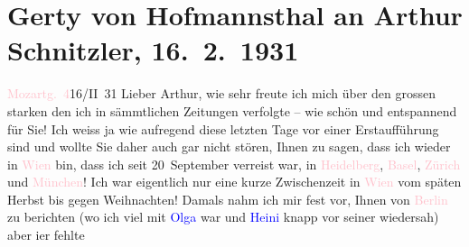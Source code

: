 

               \section[Gerty von Hofmannsthal an Arthur Schnitzler, 16. 2. 1931]{ Gerty von Hofmannsthal an Arthur Schnitzler, 16. 2. 1931}\nopagebreak{}\rehead{ }\normalsize\beginnumbering{} \toendnotes[C]{\smallbreak\pagebreak[2]} 
\toendnotes[C]{\smallbreak}\pstart
           \raggedleft{}{\pb}\textcolor{pink}{Mozartg. 4}{}\ledrightnote{\textcolor{pink}{Mozartgasse}}{ }16/II 31\pend
           \pstart
           Lieber Arthur, wie sehr freute ich mich über den grossen starken
                  \label{K_L02542_1v}\label{K_L02542_1h} den ich in sämmtlichen Zeitungen verfolgte –
               wie schön und entspannend für Sie! Ich weiss ja wie aufregend diese letzten Tage vor
               einer Erstaufführung sind und wollte Sie daher auch gar nicht stören, Ihnen zu sagen,
               dass ich wieder in \textcolor{pink}{Wien}{}\ledrightnote{\textcolor{pink}{Wien}} bin, dass ich seit
                  20 September verreist war, in \textcolor{pink}{Heidelberg}{}\ledrightnote{\textcolor{pink}{Heidelberg}}, \textcolor{pink}{Basel}{}\ledrightnote{\textcolor{pink}{Basel}}, \textcolor{pink}{Zürich}{}\ledrightnote{\textcolor{pink}{Zürich}} und \textcolor{pink}{München}{}\ledrightnote{\textcolor{pink}{München}}! Ich war
               eigentlich nur eine kurze Zwischenzeit in \textcolor{pink}{Wien}{}\ledrightnote{\textcolor{pink}{Wien}} vom
               späten Herbst bis gegen Weihnachten! Damals nahm ich mir fest vor, Ihnen von \textcolor{pink}{Berlin}{}\ledrightnote{\textcolor{pink}{Berlin}} zu berichten (wo ich viel mit \textcolor{blue}{Olga}{}\ledrightnote{\textcolor{blue}{Olga Schnitzler}} war und \textcolor{blue}{Heini}{}\ledrightnote{\textcolor{blue}{Heinrich Schnitzler}} knapp vor seiner \label{K_L02542_2v}\label{K_L02542_2h} wiedersah) aber i{\geminationm}er {\pb}fehlte
